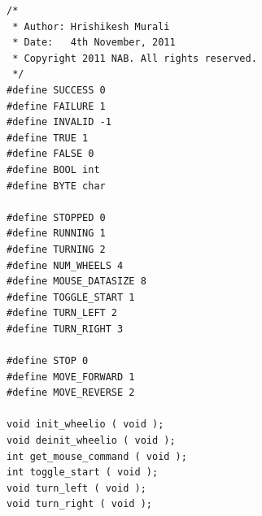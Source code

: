 \documentclass[12pt]{article}
\begin{document}
\begin{lstlisting}[caption="device.h - Device related headers"]
/* 
 * Author: Hrishikesh Murali 
 * Date:   4th November, 2011 
 * Copyright 2011 NAB. All rights reserved.
 */ 
#define SUCCESS 0 
#define FAILURE 1 
#define INVALID -1 
#define TRUE 1 
#define FALSE 0 
#define BOOL int 
#define BYTE char 

#define STOPPED 0 
#define RUNNING 1 
#define TURNING 2 
#define NUM_WHEELS 4 
#define MOUSE_DATASIZE 8 
#define TOGGLE_START 1 
#define TURN_LEFT 2 
#define TURN_RIGHT 3 

#define STOP 0 
#define MOVE_FORWARD 1 
#define MOVE_REVERSE 2 

void init_wheelio ( void ); 
void deinit_wheelio ( void ); 
int get_mouse_command ( void ); 
int toggle_start ( void ); 
void turn_left ( void ); 
void turn_right ( void );
\end{lstlisting}
\end{document}
